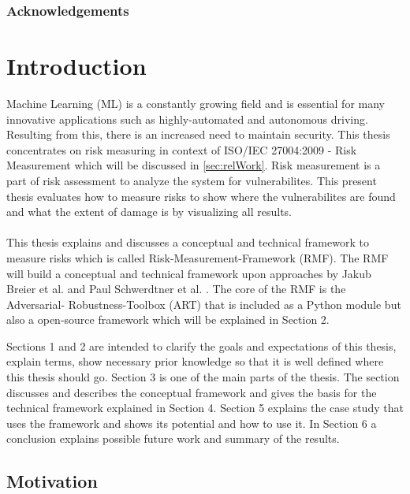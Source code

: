 \begin{abstract}

\end{abstract}

\subsubsection*{Acknowledgements}

\newpage

\section{Introduction}
\label{sec:intro}

Machine Learning (ML) is a constantly growing field and is essential for many innovative applications such as highly-automated and autonomous driving. Resulting from this,
there is an increased need to maintain security. This thesis concentrates on risk measuring in context of ISO/IEC 27004:2009 - Risk Measurement which will be discussed in \ref{sec:relWork}. Risk
measurement is a part of risk assessment to analyze the system for vulnerabilites. This present thesis evaluates how to measure risks to show where the vulnerabilites are found and what the extent of
damage is by visualizing all results. \\ \\
This thesis explains and discusses a conceptual and technical framework to measure risks which is called Risk-Measurement-Framework (RMF). The RMF will build a conceptual and technical
framework upon approaches by Jakub Breier et al. \cite{DBLP:journals/corr/abs-2012-04884} and Paul Schwerdtner et al. \cite{DBLP:journals/corr/abs-2011-04328}. The core of the RMF is the Adversarial-
Robustness-Toolbox (ART) that is included as a Python module but also a open-source framework which will be explained in Section 2.

Sections 1 and 2 are intended to clarify the goals and expectations of this thesis, explain terms, show necessary prior knowledge so that it is well defined where this thesis should go. Section 3 is one
of the main parts of the thesis. The section discusses and describes the conceptual framework and gives the basis for the technical framework explained in Section 4. Section 5 explains the case study
that uses the framework and shows its potential and how to use it. In Section 6 a conclusion explains possible future work and summary of the results.

\subsection{Motivation}

